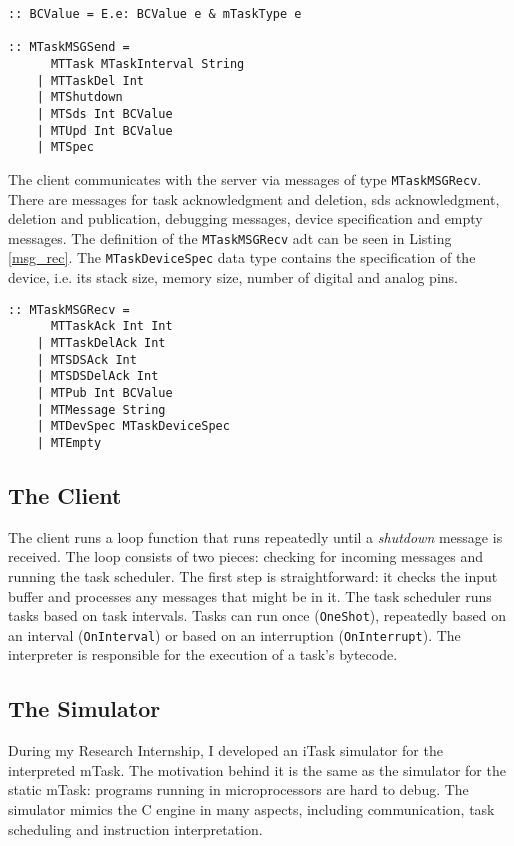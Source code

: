 \begin{lstlisting}[caption=Communication protocol: sent messages,captionpos=b,label=msg_send]
:: BCValue = E.e: BCValue e & mTaskType e

:: MTaskMSGSend = 
      MTTask MTaskInterval String
    | MTTaskDel Int
    | MTShutdown
    | MTSds Int BCValue
    | MTUpd Int BCValue
    | MTSpec
\end{lstlisting}

The client communicates with the server via messages of type \texttt{MTaskMSGRecv}. There are messages for task acknowledgment and deletion, \ac{sds} acknowledgment, deletion and publication, debugging messages, device specification and empty messages. The definition of the \texttt{MTaskMSGRecv} \ac{adt} can be seen in Listing \ref{msg_rec}. The \texttt{MTaskDeviceSpec} data type contains the specification of the device, i.e. its stack size, memory size, number of digital and analog pins.

\begin{lstlisting}[caption=Communication protocol: received messages,captionpos=b,label=msg_rec]
:: MTaskMSGRecv = 
      MTTaskAck Int Int
    | MTTaskDelAck Int
    | MTSDSAck Int
    | MTSDSDelAck Int
    | MTPub Int BCValue
    | MTMessage String
    | MTDevSpec MTaskDeviceSpec
    | MTEmpty
\end{lstlisting}

\subsection{The Client}

The client runs a loop function that runs repeatedly until a \textit{shutdown} message is received. The loop consists of two pieces: checking for incoming messages and running the task scheduler. The first step is straightforward: it checks the input buffer and processes any messages that might be in it. The task scheduler runs tasks based on task intervals. Tasks can run once (\texttt{OneShot}), repeatedly based on an interval (\texttt{OnInterval}) or based on an interruption (\texttt{OnInterrupt}). The interpreter is responsible for the execution of a task's bytecode.

\subsection{The Simulator}

During my Research Internship, I developed an iTask simulator for the interpreted mTask. The motivation behind it is the same as the simulator for the static mTask: programs running in microprocessors are hard to debug. The simulator mimics the C engine in many aspects, including communication, task scheduling and instruction interpretation. 

